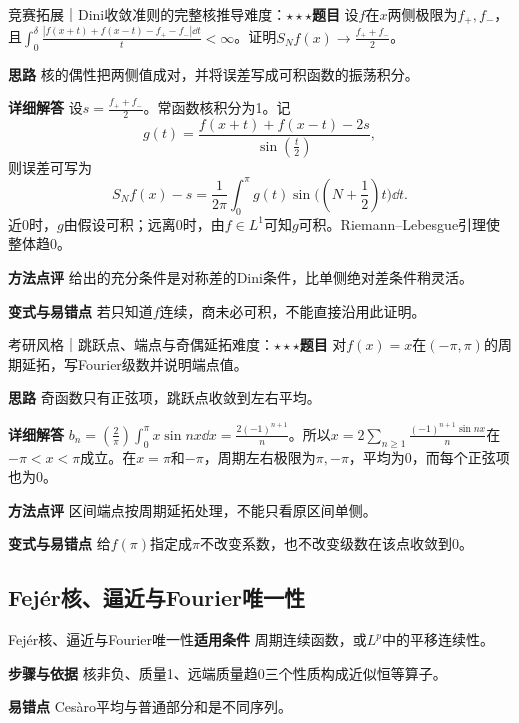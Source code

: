 \begin{example}{竞赛拓展｜Dini收敛准则的完整核推导}{难度：$\star\star\star$}\label{deep:ex:fourier_source_deep:dini}\textbf{题目} 设$f$在$x$两侧极限为$f_+,f_-$，且$\int_0^\delta\frac{|f(x+t)+f(x-t)-f_+-f_-|\dd t}{t}<\infty$。证明$S_Nf(x)\to\frac{f_++f_-}{2}$。\par\textbf{思路} 核的偶性把两侧值成对，并将误差写成可积函数的振荡积分。\par\textbf{详细解答} 设$s=\frac{f_++f_-}{2}$。常函数核积分为1。记
\[g(t)=\dfrac{f(x+t)+f(x-t)-2s}{\sin(\frac{t}{2})},\]
则误差可写为
\[S_Nf(x)-s=\dfrac{1}{2\pi}\int_0^\pi
     g(t)\sin\bigl((N+\dfrac12)t\bigr)\dd t.\]
近0时，$g$由假设可积；远离0时，由$f\in L^1$可知$g$可积。Riemann--Lebesgue引理使整体趋0。\par\textbf{方法点评} 给出的充分条件是对称差的Dini条件，比单侧绝对差条件稍灵活。\par\textbf{变式与易错点} 若只知道$f$连续，商未必可积，不能直接沿用此证明。\end{example}

\begin{example}{考研风格｜跳跃点、端点与奇偶延拓}{难度：$\star\star\star$}\label{deep:ex:fourier_source_deep:jump}\textbf{题目} 对$f(x)=x$在$(-\pi,\pi)$的周期延拓，写Fourier级数并说明端点值。\par\textbf{思路} 奇函数只有正弦项，跳跃点收敛到左右平均。\par\textbf{详细解答} $b_n=(\frac{2}{\pi})\int_0^\pi x\sin nx\dd x=\frac{2(-1)^{n+1}}{n}$。所以$x=2\sum_{n\ge1}\frac{(-1)^{n+1}\sin nx}{n}$在$-\pi<x<\pi$成立。在$x=\pi$和$-\pi$，周期左右极限为$\pi,-\pi$，平均为0，而每个正弦项也为0。\par\textbf{方法点评} 区间端点按周期延拓处理，不能只看原区间单侧。\par\textbf{变式与易错点} 给$f(\pi)$指定成$\pi$不改变系数，也不改变级数在该点收敛到0。\end{example}

\subsection{Fejér核、逼近与Fourier唯一性}\label{deep:fourier_source_deep:fejerproof}

\begin{method}{Fejér核、逼近与Fourier唯一性}\textbf{适用条件} 周期连续函数，或$L^p$中的平移连续性。\par\textbf{步骤与依据} 核非负、质量1、远端质量趋0三个性质构成近似恒等算子。\par\textbf{易错点} Cesàro平均与普通部分和是不同序列。\end{method}


